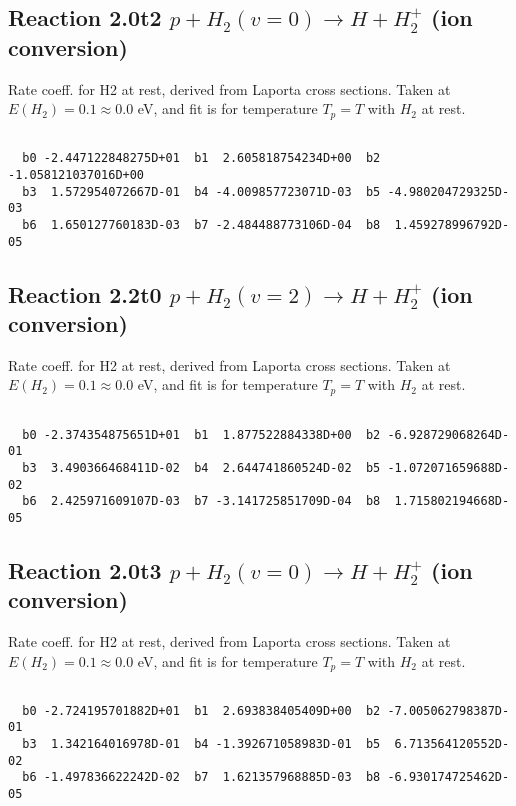 \documentclass[12pt,dvipdfmx]{article}
\begin{document}
\newpage
\subsection{
Reaction 2.0t2
$ p + H_2(v=0) \rightarrow H + H_2^+$ (ion conversion)
}
Rate coeff. for H2 at rest, derived from Laporta cross sections.
Taken at $E(H_2) = 0.1 \approx 0.0$ eV,  and fit is for temperature $T_p=T$ with $H_2$ at rest.

\begin{small}\begin{verbatim}

  b0 -2.447122848275D+01  b1  2.605818754234D+00  b2 -1.058121037016D+00
  b3  1.572954072667D-01  b4 -4.009857723071D-03  b5 -4.980204729325D-03
  b6  1.650127760183D-03  b7 -2.484488773106D-04  b8  1.459278996792D-05

\end{verbatim}\end{small}

\newpage
\subsection{
Reaction 2.2t0
$ p + H_2(v=2) \rightarrow H + H_2^+$ (ion conversion)
}
Rate coeff. for H2 at rest, derived from Laporta cross sections.
Taken at $E(H_2) = 0.1 \approx 0.0$ eV,  and fit is for temperature $T_p=T$ with $H_2$ at rest.

\begin{small}\begin{verbatim}

  b0 -2.374354875651D+01  b1  1.877522884338D+00  b2 -6.928729068264D-01
  b3  3.490366468411D-02  b4  2.644741860524D-02  b5 -1.072071659688D-02
  b6  2.425971609107D-03  b7 -3.141725851709D-04  b8  1.715802194668D-05

\end{verbatim}\end{small}

\newpage
\subsection{
Reaction 2.0t3
$ p + H_2(v=0) \rightarrow H + H_2^+$ (ion conversion)
}
Rate coeff. for H2 at rest, derived from Laporta cross sections.
Taken at $E(H_2) = 0.1 \approx 0.0$ eV,  and fit is for temperature $T_p=T$ with $H_2$ at rest.

\begin{small}\begin{verbatim}

  b0 -2.724195701882D+01  b1  2.693838405409D+00  b2 -7.005062798387D-01
  b3  1.342164016978D-01  b4 -1.392671058983D-01  b5  6.713564120552D-02
  b6 -1.497836622242D-02  b7  1.621357968885D-03  b8 -6.930174725462D-05

\end{verbatim}\end{small}
\end{document}
